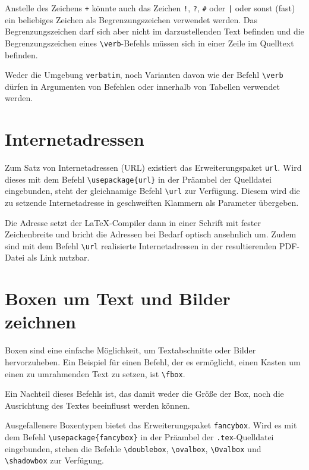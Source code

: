 
Anstelle des Zeichens \verb|+| könnte auch das Zeichen \verb?!?, \verb#?#, \verb<#< oder \verb!|! oder sonst (fast) ein beliebiges Zeichen als Begrenzungszeichen
verwendet werden. Das Begrenzungszeichen darf sich
aber nicht im darzustellenden Text befinden und die 
Begrenzungszeichen eines \verb!\verb!-Befehls müssen sich 
in einer Zeile im Quelltext befinden. 

Weder die Umgebung \verb!verbatim!, noch Varianten davon wie der Befehl \verb!\verb! dürfen in Argumenten von Befehlen oder innerhalb von Tabellen verwendet werden.

\section{Internetadressen}

Zum Satz von Internetadressen (URL) existiert das Erweiterungspaket \verb!url!. Wird dieses mit dem Befehl \verb!\usepackage{url}! in der Präambel der Quelldatei eingebunden, steht der gleichnamige Befehl \verb!\url! zur Verfügung. Diesem wird die zu setzende
Internetadresse in geschweiften Klammern als Parameter übergeben. 


Die Adresse setzt der \LaTeX-Compiler dann in einer Schrift mit fester Zeichenbreite und bricht die Adressen bei Bedarf optisch ansehnlich um.
Zudem sind mit dem Befehl \verb!\url! realisierte Internetadressen in der resultierenden PDF-Datei als Link nutzbar.

\section{Boxen um Text und Bilder zeichnen}
\label{Abschnitt_Boxen}

Boxen sind eine einfache Möglichkeit, um Textabschnitte oder Bilder hervorzuheben. 
Ein Beispiel für einen Befehl, der es ermöglicht, einen Kasten um einen zu umrahmenden Text zu setzen, ist \verb!\fbox!.


Ein Nachteil dieses Befehls ist, das damit weder die Größe der Box, noch die Ausrichtung des Textes beeinflusst werden können.

Ausgefallenere Boxentypen bietet das Erweiterungspaket \verb!fancybox!. Wird es mit dem Befehl \verb!\usepackage{fancybox}! in der Präambel der \verb!.tex!-Quelldatei eingebunden, stehen die Befehle \verb!\doublebox!, \verb!\ovalbox!, \verb!\Ovalbox! und \verb!\shadowbox! zur Verfügung.

